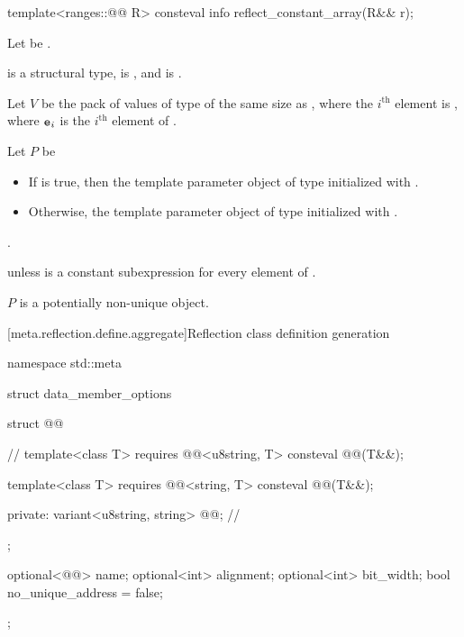 %
\begin{itemdecl}
template<ranges::@@ R>
  consteval info reflect_constant_array(R&& r);
\end{itemdecl}

\begin{itemdescr}
\pnum
Let  be .

\pnum
\mandates
{} is a structural type,
 is , and
 is .

\pnum
Let $V$ be the pack of values of type 
of the same size as ,
where the $i^\text{th}$ element is ,
where $\texttt{\protect e}_i$ is the $i^\text{th}$ element of .

\pnum
Let $P$ be
\begin{itemize}
\item
  If  is true,
  then the template parameter object
  of type 
  initialized with .
\item
  Otherwise, the template parameter object
  of type 
  initialized with \tcode{\{\}}.
\end{itemize}

\pnum
\returns
{}.

\pnum
\throws
{} unless
 is a constant subexpression
for every element  of .

\pnum
\begin{note}
$P$ is a potentially non-unique object.
\end{note}
\end{itemdescr}

[meta.reflection.define.aggregate]{Reflection class definition generation}

%
\begin{codeblock}
namespace std::meta {
  struct data_member_options {
    struct @@ {                          // \expos
      template<class T>
        requires @@<u8string, T>
        consteval @@(T&&);

      template<class T>
        requires @@<string, T>
        consteval @@(T&&);

    private:
      variant<u8string, string> @@;       // \expos
    };

    optional<@@> name;
    optional<int> alignment;
    optional<int> bit_width;
    bool no_unique_address = false;
  };
}
\end{codeblock}


